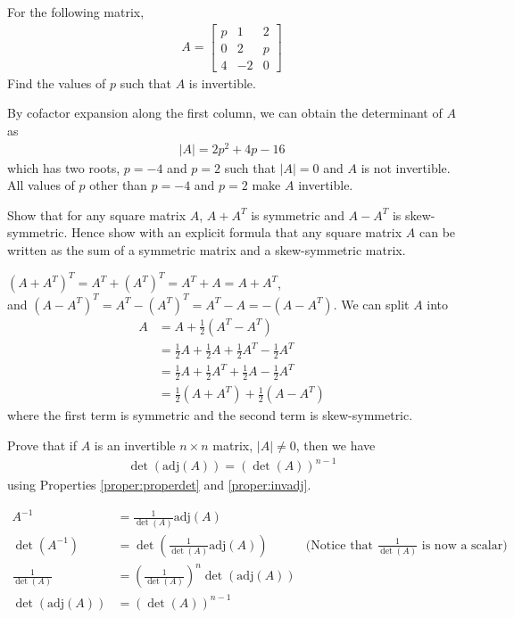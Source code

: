 \begin{Exercise}
For the following matrix,
\begin{align*}
A = 
\begin{bmatrix}
p & 1 & 2\\
0 & 2 & p\\
4 & -2 & 0
\end{bmatrix} 
\end{align*}
Find the values of $p$ such that $A$ is invertible.
\end{Exercise}
\begin{Answer}
By cofactor expansion along the first column, we can obtain the determinant of $A$ as
\begin{align*}
|A| = 2p^2 + 4p - 16
\end{align*}
which has two roots, $p = -4$ and $p = 2$ such that $|A| = 0$ and $A$ is not invertible. All values of $p$ other than $p = -4$ and $p = 2$ make $A$ invertible.
\end{Answer}

\begin{Exercise}
\label{ex:symskew}
Show that for any square matrix $A$, $A + A^T$ is symmetric and $A - A^T$ is skew-symmetric. Hence show with an explicit formula that any square matrix $A$ can be written as the sum of a symmetric matrix and a skew-symmetric matrix.
\end{Exercise}
\begin{Answer}
$(A + A^T)^T = A^T + (A^T)^T = A^T+A = A+A^T$,\\
and $(A - A^T)^T = A^T - (A^T)^T = A^T-A = -(A - A^T)$. We can split $A$ into
\begin{align*}
A &= A + \frac{1}{2}(A^T - A^T) \\
&= \frac{1}{2}A + \frac{1}{2}A + \frac{1}{2}A^T - \frac{1}{2}A^T \\
&= \frac{1}{2}A + \frac{1}{2}A^T + \frac{1}{2}A - \frac{1}{2}A^T \\
&= \frac{1}{2}(A + A^T) + \frac{1}{2}(A - A^T)
\end{align*}
where the first term is symmetric and the second term is skew-symmetric.
\end{Answer}

\begin{Exercise}
Prove that if $A$ is an invertible $n \times n$ matrix, $|A| \neq 0$, then we have
\begin{align*}
\det(\text{adj}(A))=(\det(A))^{n-1}    
\end{align*}
using Properties \ref{proper:properdet} and \ref{proper:invadj}.
\end{Exercise}
\begin{Answer}
\begin{align*}
A^{-1} &= \frac{1}{\det(A)}\text{adj}(A) \\
\det(A^{-1}) &= \det(\frac{1}{\det(A)}\text{adj}(A)) & \text{(Notice that $\frac{1}{\det(A)}$ is now a scalar)}\\
\frac{1}{\det(A)} &= (\frac{1}{\det(A)})^n\det(\text{adj}(A)) \\
\det(\text{adj}(A)) &= (\det(A))^{n-1}  
\end{align*}
\end{Answer}
